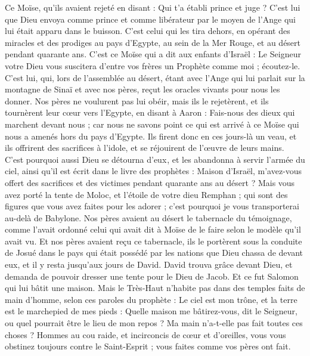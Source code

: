 \begin{multicols}{2}
Ce Moïse, qu'ils avaient rejeté en disant : Qui t'a établi prince et juge ? C'est lui que Dieu envoya comme prince et comme libérateur par le moyen de l'Ange qui lui était apparu dans le buisson.
C'est celui qui les tira dehors, en opérant des miracles et des prodiges au pays d'Egypte, au sein de la Mer Rouge, et au désert pendant quarante ans.
C'est ce Moïse qui a dit aux enfants d'Israël : Le Seigneur votre Dieu vous suscitera d'entre vos frères un Prophète comme moi ; écoutez-le.
C'est lui, qui, lors de l'assemblée au désert, étant avec l'Ange qui lui parlait sur la montagne de Sinaï et avec nos pères, reçut les oracles vivants pour nous les donner.
Nos pères ne voulurent pas lui obéir, mais ils le rejetèrent, et ils tournèrent leur cœur vers l'Egypte,
en disant à Aaron : Fais-nous des dieux qui marchent devant nous ; car nous ne savons point ce qui est arrivé à ce Moïse qui nous a amenés hors du pays d'Egypte.
Ils firent donc en ces jours-là un veau, et ils offrirent des sacrifices à l'idole, et se réjouirent de l'œuvre de leurs mains.
C'est pourquoi aussi Dieu se détourna {d'eux }, et les abandonna à servir l'armée du ciel, ainsi qu'il est écrit dans le livre des prophètes : Maison d'Israël, m'avez-vous offert des sacrifices et des victimes pendant quarante ans au désert ?
Mais vous avez porté la tente de Moloc, et l'étoile de votre dieu Remphan ; qui sont des figures que vous avez faites pour les adorer ; c'est pourquoi je vous transporterai au-delà de Babylone.
Nos pères avaient au désert le tabernacle du témoignage, comme l'avait ordonné celui qui avait dit à Moïse de le faire selon le modèle qu'il avait vu.
Et nos pères avaient reçu ce tabernacle, ils le portèrent sous la conduite de Josué dans le pays qui était possédé par les nations que Dieu chassa de devant eux, et il y resta jusqu'aux jours de David.
David trouva grâce devant Dieu, et demanda de pouvoir dresser une tente pour le Dieu de Jacob.
Et ce fut Salomon qui lui bâtit une maison.
Mais le Très-Haut n'habite pas dans des temples faits de main d'homme, selon ces paroles du prophète :
Le ciel est mon trône, et la terre est le marchepied de mes pieds : Quelle maison me bâtirez-vous, dit le Seigneur, ou quel pourrait être le lieu de mon repos ?
Ma main n'a-t-elle pas fait toutes ces choses ?
Hommes au cou raide, et incirconcis de cœur et d'oreilles, vous vous obstinez toujours contre le Saint-Esprit ; vous faites comme vos pères ont fait.

\end{multicols}
